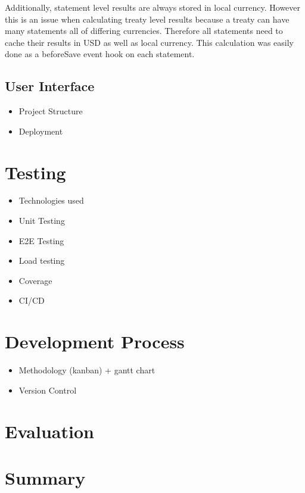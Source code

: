 \documentclass[12pt]{article}
\begin{document}
Additionally, statement level results are always stored in local currency. However this is an issue when calculating treaty level results because a treaty can have many statements all of differing currencies. Therefore all statements need to cache their results in USD as well as local currency. This calculation was easily done as a beforeSave event hook on each statement.

\subsection{User Interface}


\begin{itemize}
    \item Project Structure
    \item Deployment
\end{itemize}

\section{Testing}
\begin{itemize}
    \item Technologies used
    \item Unit Testing
    \item E2E Testing
    \item Load testing
    \item Coverage
    \item CI/CD
\end{itemize}

\section{Development Process}
\begin{itemize}
    \item Methodology (kanban) + gantt chart
    \item Version Control
\end{itemize}

\section{Evaluation}

\section{Summary}



\end{document}
